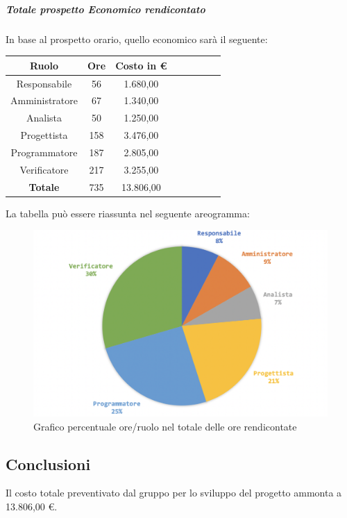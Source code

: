 				\subparagraph{Totale prospetto Economico rendicontato}
				In base al prospetto orario, quello economico sarà il seguente: 
				
				\begin{longtable}{|c|c|c|c|c|c|c|c}
					\hline
					\rowcolor{lighter-grayer}
					\textbf{Ruolo} & \textbf{Ore} & \textbf{Costo in €} \\
					\hline
					\endfirsthead
					
					\hline
					Responsabile 	    & 56 & 1.680,00\\
					\hline 
					\hline
					Amministratore	  & 67 & 1.340,00\\
					\hline
					\hline
					Analista 				& 50 & 1.250,00\\
					\hline
					\hline
					Progettista 		  & 158 & 3.476,00\\
					\hline
					\hline
					Programmatore 	 & 187 & 2.805,00\\
					\hline
					\hline
					Verificatore 		  & 217 & 3.255,00\\
					\hline
					\textbf{Totale} 	& 735 & 13.806,00\\
					\hline
				\end{longtable}
				\pagebreak
				
				La tabella può essere riassunta nel seguente areogramma:
				\begin{figure}[H]
					\centering
					\includegraphics[width=0.8\linewidth]{./images/totOreRed2.png}
					\caption{Grafico percentuale ore/ruolo nel totale delle ore rendicontate}
					\label{fig:grafico costi ruolo fase totale ore rendicontate}
				\end{figure}
			
			\subsection{Conclusioni}
				Il costo totale preventivato dal gruppo per lo sviluppo del progetto ammonta a 13.806,00 €.
				
				
		
	
	